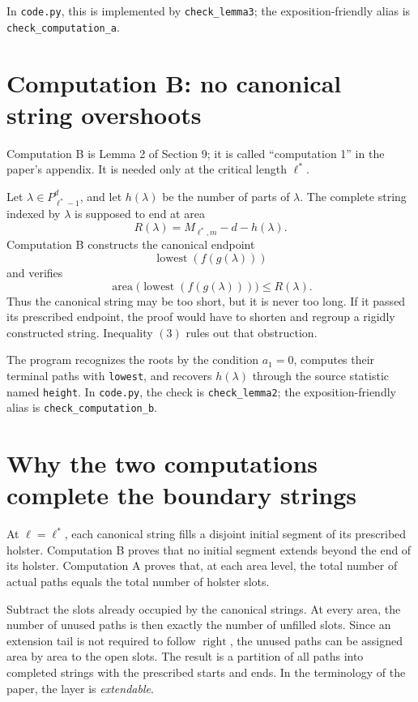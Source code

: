 \documentclass{article}
\DeclareMathOperator{\area}{area}
\DeclareMathOperator{\lowest}{lowest}
\begin{document}
In \texttt{code.py}, this is implemented by
\texttt{check\_lemma3}; the exposition-friendly alias is
\texttt{check\_computation\_a}.

\section{Computation B: no canonical string overshoots}

Computation B is Lemma 2 of Section 9; it is called ``computation 1'' in the
paper's appendix.  It is needed only at the critical length \(\ell^*\).

Let \(\lambda\in P_{\ell^*-1}^d\), and let \(h(\lambda)\) be the number of
parts of \(\lambda\).  The complete string indexed by \(\lambda\) is supposed
to end at area
\[
  R(\lambda)
  =
  M_{\ell^*,m}-d-h(\lambda).
\]
Computation B constructs the canonical endpoint
\[
  \lowest(f(g(\lambda)))
\]
and verifies
\[
  \area\bigl(\lowest(f(g(\lambda)))\bigr)
  \leq
  R(\lambda).
  \tag{3}
\]
Thus the canonical string may be too short, but it is never too long.  If it
passed its prescribed endpoint, the proof would have to shorten and regroup a
rigidly constructed string.  Inequality \((3)\) rules out that obstruction.

The program recognizes the roots by the condition \(a_1=0\), computes their
terminal paths with \texttt{lowest}, and recovers \(h(\lambda)\) through the
source statistic named \texttt{height}.  In \texttt{code.py}, the check is
\texttt{check\_lemma2}; the exposition-friendly alias is
\texttt{check\_computation\_b}.

\section{Why the two computations complete the boundary strings}

At \(\ell=\ell^*\), each canonical string fills a disjoint initial segment of
its prescribed holster.  Computation B proves that no initial segment extends
beyond the end of its holster.  Computation A proves that, at each area level,
the total number of actual paths equals the total number of holster slots.

Subtract the slots already occupied by the canonical strings.  At every area,
the number of unused paths is then exactly the number of unfilled slots.  Since
an extension tail is not required to follow \(\operatorname{right}\), the
unused paths can be assigned area by area to the open slots.  The result is a
partition of all paths into completed strings with the prescribed starts and
ends.  In the terminology of the paper, the layer is \emph{extendable}.
\end{document}
